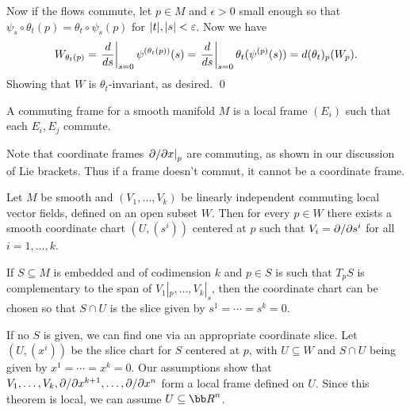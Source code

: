     Now if the flows commute, let $p\in M$ and $\epsilon>0$ small enough so that $\psi_s\circ\theta_t(p)=\theta_t\circ\psi_s(p)$
    for $\mathopen{}\mathclose{\left|t\right|},\mathopen{}\mathclose{\left|s\right|}<\varepsilon$.
    Now we have
    $$ W_{\theta_t(p)} = \left.{{d}\over{ds}}\right|_{s=0}\psi^{(\theta_t(p))}(s) = \left.{{d}\over{ds}}\right|_{s=0}\theta_t(\psi^{(p)}(s))
    = d(\theta_t)_p(W_p) . $$
    Showing that $W$ is $\theta_t$-invariant, as desired.
    \qed

\eproof

\bdefn

    A {\emphcolor commuting frame} for a smooth manifold $M$ is a local frame $(E_i)$ such that each $E_i,E_j$ commute.

\edefn

Note that coordinate frames $\left.\partial /\partial x\right|_p$ are commuting, as shown in our discussion of Lie brackets.
Thus if a frame doesn't commut, it cannot be a coordinate frame.

\bthrm

    Let $M$ be smooth and $(V_1,\dots,V_k)$ be linearly independent commuting local vector fields, defined on an open
    subset $W$.
    Then for every $p\in W$ there exists a smooth coordinate chart $(U,(s^i))$ centered at $p$ such that $V_i=\partial /\partial s^i$
    for all $i=1,\dots,k$.

    If $S\subseteq M$ is embedded and of codimension $k$ and $p\in S$ is such that $T_pS$ is complementary to the span
    of $V_1|_p,\dots,V_k|_s$, then the coordinate chart can be chosen so that $S\cap U$ is the slice given by
    $s^1=\cdots=s^k=0$.

\ethrm

\bproof

    If no $S$ is given, we can find one via an appropriate coordinate slice.
    Let $(U,(x^i))$ be the slice chart for $S$ centered at $p$, with $U\subseteq W$ and $S\cap U$ being given by
    $x^1=\cdots=x^k=0$.
    Our assumptions show that $V_1,\dots,V_k,\partial /\partial x^{k+1},\dots,\partial /\partial x^n$ form a local frame defined on $U$.
    Since this theorem is local, we can assume $U\subseteq\bR^n$.


